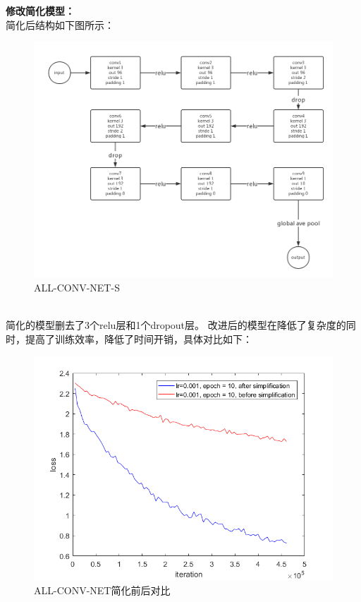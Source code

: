 \documentclass[a4paper,UTF8]{article}
\numberwithin{equation}{section}
\begin{document}
\begin{enumerate}
\textbf{修改简化模型：}\\
简化后结构如下图所示：
\begin{figure}[!h]
	\centering   
	\includegraphics[scale=0.3]{ng2.png}  
	\caption{ALL-CONV-NET-S} 
	\label{ng2}
\end{figure}\\
简化的模型删去了3个relu层和1个dropout层。
改进后的模型在降低了复杂度的同时，提高了训练效率，降低了时间开销，具体对比如下：
\begin{figure}[!h]
	\centering   
	\includegraphics[scale=0.5]{after-before-simplification.png}  
	\caption{ALL-CONV-NET简化前后对比} 
	\label{acn0}
\end{figure}\\

\end{enumerate}
\end{document}
